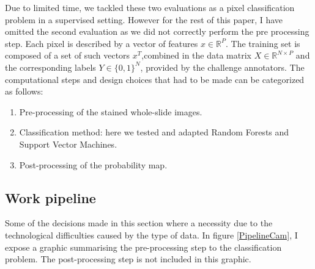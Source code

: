 \documentclass[a4paper,10pt]{article}
\begin{document}
Due to limited time, we tackled these two evaluations as a pixel classification problem in a supervised setting. However for the rest of this paper, I have omitted the second evaluation as we did not correctly perform the pre processing step. Each pixel is described by a vector of features $x \in \mathbb{R}^P$. The training set is composed of a set of such vectors $x^T$,combined in the data matrix $X \in \mathbb{R}^{N \times P}$ and the corresponding labels $Y \in \{0,1\}^N$, provided by the challenge annotators. 
The computational steps and design choices that had to be made can be categorized as follows: 
\begin{enumerate}
	\item Pre-processing of the stained whole-slide images.
         \item Classification method: here we tested and adapted
           Random Forests and Support Vector Machines. 
         \item Post-processing of the probability map.
\end{enumerate}

\subsection{Work pipeline}
Some of the decisions made in this section where a necessity due to the technological difficulties caused by the type of data. In figure \ref{PipelineCam}, I expose a graphic summarising the pre-processing step to the classification problem. The post-processing step is not included in this graphic.
\end{document}
